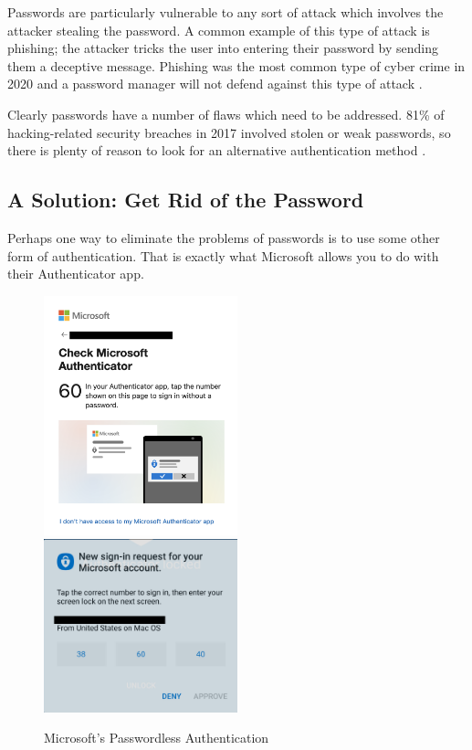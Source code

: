 \documentclass[12pt, letterpaper]{article}
\begin{document}
Passwords are particularly vulnerable to any sort of attack which involves the attacker stealing the password.
A common example of this type of attack is phishing; the attacker tricks the user into entering their password by sending them a deceptive message.
Phishing was the most common type of cyber crime in 2020 and a password manager will not defend against this type of attack \parencite{fbi2020icr}.

Clearly passwords have a number of flaws which need to be addressed.
81\% of hacking-related security breaches in 2017 involved stolen or weak passwords, so there is plenty of reason to look for an alternative authentication method \parencite{verizon2017dbir}.

\subsection{A Solution: Get Rid of the Password}
Perhaps one way to eliminate the problems of passwords is to use some other form of authentication.
That is exactly what Microsoft allows you to do with their Authenticator app. 

\begin{figure}[ht]
\includegraphics[width=0.5\textwidth]{mslogin.png}
\includegraphics[width=0.5\textwidth]{authenticator.png}
\caption{Microsoft's Passwordless Authentication\label{msauth}}
\end{figure}
\end{document}
